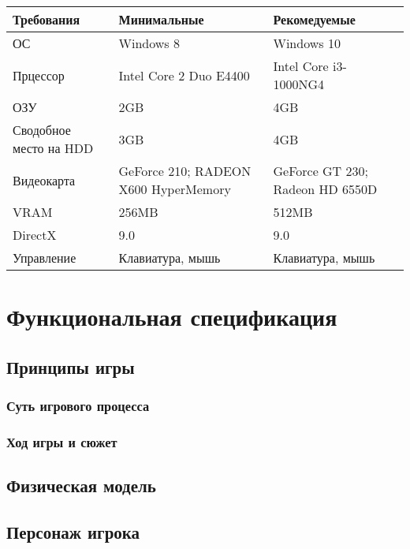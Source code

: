 \documentclass{article}
\begin{document}
\begin{table}
    \begin{tabularx}{\textwidth}{|X|X|X|} \hline  
         Требования&  Минимальные& Рекомедуемые\\ \hline  
         ОС&  Windows 8& Windows 10\\ \hline  
         Прцессор&  Intel Core 2 Duo E4400& Intel Core i3-1000NG4\\ \hline  
         ОЗУ&  2GB& 4GB\\ \hline  
         Сводобное место на HDD&  3GB& 4GB\\ \hline  
         Видеокарта&   GeForce 210; RADEON X600  HyperMemory&  GeForce GT 230; Radeon HD 6550D\\ \hline  
         VRAM&  256MB& 512MB\\ \hline  
         DirectX&  9.0& 9.0\\ \hline  
         Управление&  Клавиатура, мышь& Клавиатура, мышь\\ \hline 
    \end{tabularx}
    
    
\end{table}


\newpage
\section{Функциональная спецификация}
\subsection{Принципы игры}
\subsubsection{Суть игрового процесса}

\subsubsection{Ход игры и сюжет}

\subsection{Физическая модель}

\subsection{Персонаж игрока}
\end{document}
